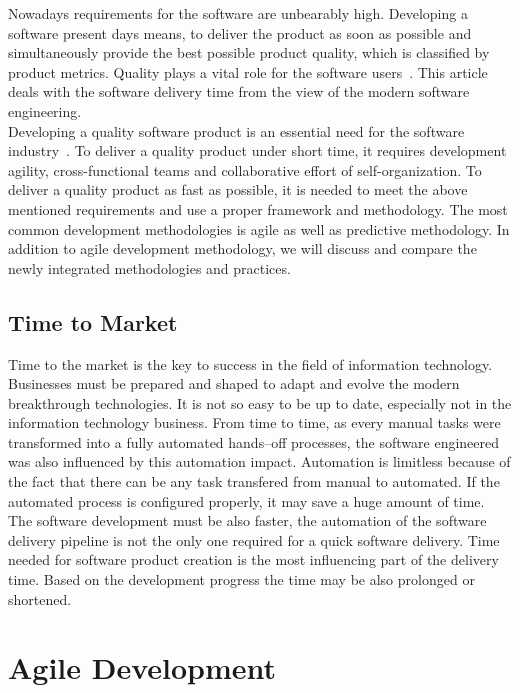 \documentclass[12pt,a4paper]{article}
\theoremstyle{definition}
\begin{document}
    Nowadays requirements for the software are unbearably high. Developing a software present days means, to deliver the product as soon as possible and simultaneously provide the best possible product quality, which is classified by product metrics. Quality plays a vital role for the software users~\cite{8748529}. This article deals with the software delivery time from the view of the modern software engineering.\\

    Developing a quality software product is an essential need for the software industry~\cite{8748529}. To deliver a quality product under short time, it requires development agility, cross-functional teams and collaborative effort of self-organization. To deliver a quality product as fast as possible, it is needed to meet the above mentioned requirements and use a proper framework and methodology. The most common development methodologies is agile as well as predictive methodology. In addition to agile development methodology, we will discuss and compare the newly integrated methodologies and practices.

    \subsection{Time to Market}

        Time to the market is the key to success in the field of information technology. Businesses must be prepared and shaped to adapt and evolve the modern breakthrough technologies. It is not so easy to be up to date, especially not in the information technology business. From time to time, as every manual tasks were transformed into a fully automated hands--off processes, the software engineered was also influenced by this automation impact. Automation is limitless because of the fact that there can be any task transfered from manual to automated. If the automated process is configured properly, it may save a huge amount of time.\\

        The software development must be also faster, the automation of the software delivery pipeline is not the only one required for a quick software delivery. Time needed for software product creation is the most influencing part of the delivery time. Based on the development progress the time may be also prolonged or shortened.

\section{Agile Development}
\end{document}
